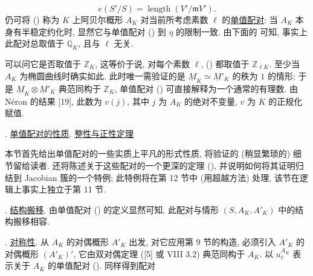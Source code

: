 \begin{equation*}
e(S'/S)=\operatorname{length}(V'/\mathfrak mV').
\end{equation*}
仍可将 () 称为 $K$ 上阿贝尔概形 $A_K$ 对当前所考虑素数 $\ell$ 的\underline{单值配对}: 当 $A_K$ 本身有半稳定约化时, 显然它与单值配对 () 到 $\eta$ 的限制一致. 由下面的  可知, 事实上此配对总取值于 $\mathbb Q_K$, 且与 $\ell$ 无关.

可以问它是否取值于 $\mathbb Z_K$, 这等价于说, 对每个素数 $\ell$, () 都取值于 $\mathbb Z_{\ell K}$. 至少当 $A_K$ 为椭圆曲线时确实如此. 此时唯一需验证的是 $\underline M_K\simeq\underline M'_K$ 的秩为 $1$ 的情形; 于是 $\underline M_K\otimes\underline M'_K$ 典范同构于 $\mathbb Z_K$, 单值配对 () 可直接解释为一个通常的有理数. 由 Néron 的结果 [19], 此数为 $v(j)$, 其中 $j$ 为 $A_K$ 的绝对不变量, $v$ 为 $K$ 的正规化赋值.




\medskip
{}. \underline{单值配对的性质}. \underline{整性与正性定理}

本节首先给出单值配对的一些实质上平凡的形式性质, 将验证的 (稍显繁琐的) 细节留给读者. 还将陈述关于这些配对的一个更深的定理 (), 并说明如何将其证明归结到 Jacobian 簇的一个特例; 此特例将在第 12 节中 (用超越方法) 处理, 该节在逻辑上事实上独立于第 11 节.

\medskip
\noindent
{}. \underline{结构搬移}. 由单值配对 () 的定义显然可知, 此配对与情形 $(S,A_K,A'_K)$ 中的结构搬移相容.

\medskip
\noindent
{}. \underline{对称性}. 从 $A_K$ 的对偶概形 $A'_K$ 出发, 对它应用第 9 节的构造, 必须引入 $A'_K$ 的对偶概形 $(A'_K)'$, 它由双对偶定理 ([5] 或 VIII 3.2) 典范同构于 $A_K$. 以 $u_\ell^{A_K}$ 表示关于 $A_K$ 的单值配对 (). 同样得到配对

